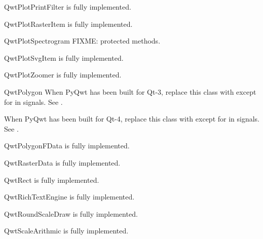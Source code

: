 \documentclass{manual}
\begin{document}
\begin{classdesc*}{QwtPlotPrintFilter}
  is fully implemented.
\end{classdesc*}

\begin{classdesc*}{QwtPlotRasterItem}
  is fully implemented.
\end{classdesc*}

\begin{classdesc*}{QwtPlotSpectrogram}
  FIXME: protected methods.
\end{classdesc*}

\begin{classdesc*}{QwtPlotSvgItem}
  is fully implemented.
\end{classdesc*}

\begin{classdesc*}{QwtPlotZoomer}
  is fully implemented.
\end{classdesc*}

\begin{classdesc*}{QwtPolygon}
  When PyQwt has been built for Qt-3, replace this class with
   except for in signals. See .

  When PyQwt has been built for Qt-4, replace this class with 
  except for in signals. See .
\end{classdesc*}

\begin{classdesc*}{QwtPolygonFData}
  is fully implemented.
\end{classdesc*}

\begin{classdesc*}{QwtRasterData}
  is fully implemented.
\end{classdesc*}

\begin{classdesc*}{QwtRect}
  is fully implemented.
\end{classdesc*}

\begin{classdesc*}{QwtRichTextEngine}
  is fully implemented.
\end{classdesc*}

\begin{classdesc*}{QwtRoundScaleDraw}
  is fully implemented.
\end{classdesc*}

\begin{classdesc*}{QwtScaleArithmic}
  is fully implemented.
\end{classdesc*}
\end{document}
